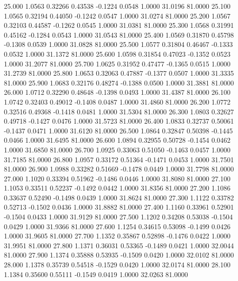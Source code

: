   25.000   1.0563   0.32266   0.43538  -0.1224   0.0548   1.0000  31.0196  81.0000
  25.100   1.0565   0.32194   0.44050  -0.1242   0.0547   1.0000  31.0274  81.0000
  25.200   1.0567   0.32103   0.44587  -0.1262   0.0545   1.0000  31.0381  81.0000
  25.300   1.0568   0.31991   0.45162  -0.1284   0.0543   1.0000  31.0543  81.0000
  25.400   1.0569   0.31870   0.45798  -0.1308   0.0539   1.0000  31.0828  81.0000
  25.500   1.0577   0.31804   0.46467  -0.1333   0.0532   1.0000  31.1372  81.0000
  25.600   1.0598   0.31854   0.47023  -0.1352   0.0523   1.0000  31.2077  81.0000
  25.700   1.0625   0.31952   0.47477  -0.1365   0.0515   1.0000  31.2739  81.0000
  25.800   1.0653   0.32063   0.47887  -0.1377   0.0507   1.0000  31.3335  81.0000
  25.900   1.0683   0.32176   0.48274  -0.1388   0.0500   1.0000  31.3881  81.0000
  26.000   1.0712   0.32290   0.48648  -0.1398   0.0493   1.0000  31.4387  81.0000
  26.100   1.0742   0.32403   0.49012  -0.1408   0.0487   1.0000  31.4860  81.0000
  26.200   1.0772   0.32516   0.49368  -0.1418   0.0481   1.0000  31.5304  81.0000
  26.300   1.0803   0.32627   0.49718  -0.1427   0.0476   1.0000  31.5723  81.0000
  26.400   1.0833   0.32737   0.50061  -0.1437   0.0471   1.0000  31.6120  81.0000
  26.500   1.0864   0.32847   0.50398  -0.1445   0.0466   1.0000  31.6495  81.0000
  26.600   1.0894   0.32955   0.50728  -0.1454   0.0462   1.0000  31.6850  81.0000
  26.700   1.0925   0.33063   0.51050  -0.1463   0.0457   1.0000  31.7185  81.0000
  26.800   1.0957   0.33172   0.51364  -0.1471   0.0453   1.0000  31.7501  81.0000
  26.900   1.0988   0.33282   0.51669  -0.1478   0.0449   1.0000  31.7798  81.0000
  27.000   1.1020   0.33394   0.51962  -0.1486   0.0446   1.0000  31.8080  81.0000
  27.100   1.1053   0.33511   0.52237  -0.1492   0.0442   1.0000  31.8356  81.0000
  27.200   1.1086   0.33637   0.52490  -0.1498   0.0439   1.0000  31.8624  81.0000
  27.300   1.1122   0.33782   0.52713  -0.1502   0.0436   1.0000  31.8882  81.0000
  27.400   1.1160   0.33961   0.52901  -0.1504   0.0433   1.0000  31.9129  81.0000
  27.500   1.1202   0.34208   0.53038  -0.1504   0.0429   1.0000  31.9366  81.0000
  27.600   1.1254   0.34615   0.53098  -0.1499   0.0426   1.0000  31.9605  81.0000
  27.700   1.1352   0.35867   0.52898  -0.1476   0.0422   1.0000  31.9951  81.0000
  27.800   1.1371   0.36031   0.53365  -0.1489   0.0421   1.0000  32.0044  81.0000
  27.900   1.1374   0.35888   0.53935  -0.1509   0.0420   1.0000  32.0102  81.0000
  28.000   1.1378   0.35739   0.54518  -0.1529   0.0420   1.0000  32.0174  81.0000
  28.100   1.1384   0.35600   0.55111  -0.1549   0.0419   1.0000  32.0263  81.0000
